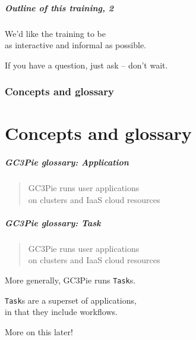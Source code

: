\documentclass[english,serif,mathserif,usenames,dvipsnames]{beamer}
\begin{document}
\begin{frame}
  \frametitle{Outline of this training, 2}
  \begin{center}
    We'd like the training to be \\ as interactive and informal as possible.

    \+ If you have a question, just ask -- don't wait.
  \end{center}
\end{frame}


\section{Concepts and glossary}
\part{Concepts and glossary}


\begin{frame}
  \frametitle{GC3Pie glossary: Application}
  \begin{quote}
    GC3Pie runs \alert<2-3>{user applications}
    \\
    on clusters and IaaS cloud resources
  \end{quote}

\end{frame}



\begin{frame}
  \frametitle{GC3Pie glossary: Task}
  \begin{quote}
    GC3Pie \alert{runs} user applications
    \\
    on clusters and IaaS cloud resources
  \end{quote}

  \+ More generally, GC3Pie runs \texttt{Task}s.

  \+ \texttt{Task}s are a superset of applications,
  \\ in that they include workflows.

  \+ More on this later!
\end{frame}
\end{document}
